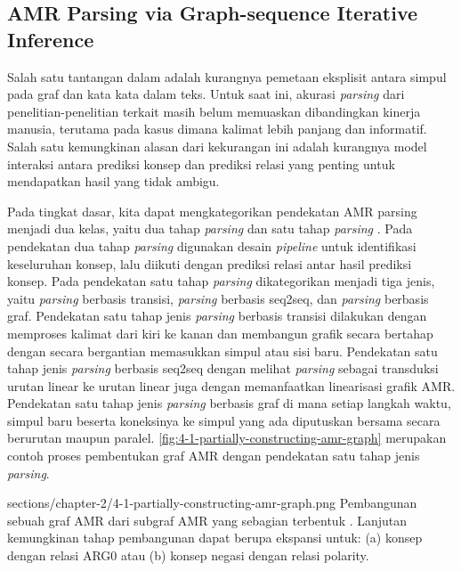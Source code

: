 \subsection{AMR Parsing via Graph-sequence Iterative Inference }

Salah satu tantangan dalam \amrparsing{} adalah kurangnya pemetaan eksplisit antara simpul pada graf dan kata kata dalam teks.
Untuk saat ini, akurasi \textit{parsing} dari penelitian-penelitian terkait masih belum memuaskan dibandingkan kinerja manusia, terutama pada kasus dimana kalimat lebih panjang dan informatif.
Salah satu kemungkinan alasan dari kekurangan ini adalah kurangnya model interaksi antara prediksi konsep dan prediksi relasi yang penting untuk mendapatkan hasil yang tidak ambigu.

Pada tingkat dasar, kita dapat mengkategorikan pendekatan AMR parsing menjadi dua kelas, yaitu dua tahap \textit{parsing} dan satu tahap \textit{parsing} .
Pada pendekatan dua tahap \textit{parsing} digunakan desain \textit{pipeline} untuk identifikasi keseluruhan konsep, lalu diikuti dengan prediksi relasi antar hasil prediksi konsep.
Pada pendekatan satu tahap \textit{parsing} dikategorikan menjadi tiga jenis, yaitu \textit{parsing} berbasis transisi, \textit{parsing} berbasis \gls{seq2seq}, dan \textit{parsing} berbasis graf.
Pendekatan satu tahap jenis \textit{parsing} berbasis transisi dilakukan dengan memproses kalimat dari kiri ke kanan dan membangun grafik secara bertahap dengan secara bergantian memasukkan simpul atau sisi baru.
Pendekatan satu tahap jenis \textit{parsing} berbasis \gls{seq2seq} dengan melihat \textit{parsing} sebagai transduksi urutan linear ke urutan linear juga dengan memanfaatkan linearisasi grafik AMR.
Pendekatan satu tahap jenis \textit{parsing} berbasis graf di mana setiap langkah waktu, simpul baru beserta koneksinya ke simpul yang ada diputuskan bersama secara berurutan maupun paralel.
\cref{fig:4-1-partially-constructing-amr-graph} merupakan contoh proses pembentukan graf \gls{AMR} dengan pendekatan satu tahap jenis \textit{parsing}.

  {sections/chapter-2/4-1-partially-constructing-amr-graph.png}
  {
    Pembangunan sebuah graf \gls{AMR} dari subgraf \gls{AMR} yang sebagian terbentuk .
    Lanjutan kemungkinan tahap pembangunan dapat berupa ekspansi untuk: (a) konsep  dengan relasi ARG0 atau (b) konsep negasi dengan relasi polarity.
  }


